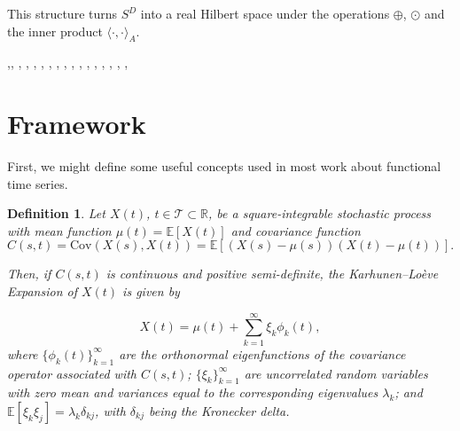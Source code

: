 \documentclass[article]{abntex2}
\newtheorem{definition}{Definition} %
\begin{document}
This structure turns $S^D$ into a real Hilbert space under the operations $\oplus$, $\odot$ and the inner product $\langle \cdot, \cdot \rangle_A$.







,, , , , , , , , , , , , , , , , 

\section{Framework}

First, we might define some useful concepts used in most work about functional time series. 

\begin{definition}
Let \( X(t) \), \( t \in \mathcal{T} \subset \mathbb{R} \), be a square-integrable stochastic process with mean function \( \mu(t) = \mathbb{E}[X(t)] \) and covariance function 
\begin{equation}
C(s, t) = \text{Cov}(X(s), X(t)) = \mathbb{E}[(X(s) - \mu(s))(X(t) - \mu(t))].
\end{equation}

Then, if \( C(s, t) \) is continuous and positive semi-definite, the Karhunen--Lo\`eve Expansion of \( X(t) \) is given by

\begin{equation}
X(t) = \mu(t) + \sum_{k=1}^\infty \xi_k \phi_k(t),
\end{equation}
where \( \{ \phi_k(t) \}_{k=1}^\infty \) are the orthonormal eigenfunctions of the covariance operator associated with \( C(s, t) \); \( \{ \xi_k \}_{k=1}^\infty \) are uncorrelated random variables with zero mean and variances equal to the corresponding eigenvalues \( \lambda_k \); and \( \mathbb{E}[\xi_k \xi_j] = \lambda_k \delta_{kj} \), with \( \delta_{kj} \) being the Kronecker delta.
\end{definition}
\end{document}
